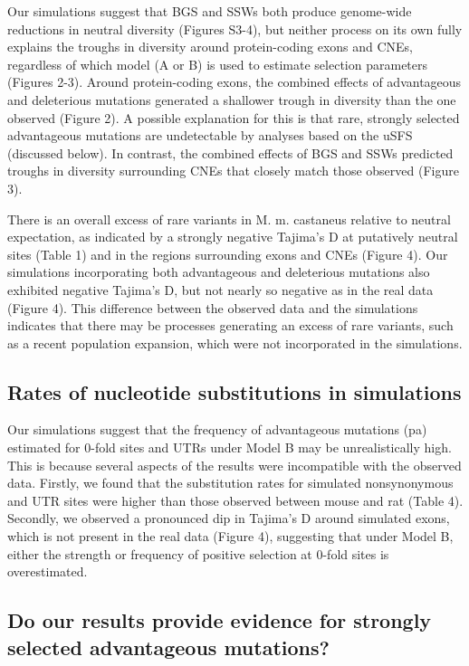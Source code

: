 Our simulations suggest that BGS and SSWs both produce genome-wide reductions in neutral diversity (Figures S3-4), but neither process on its own fully explains the troughs in diversity around protein-coding exons and CNEs, regardless of which model (A or B) is used to estimate selection parameters (Figures 2-3). Around protein-coding exons, the combined effects of advantageous and deleterious mutations generated a shallower trough in diversity than the one observed (Figure 2). A possible explanation for this is that rare, strongly selected advantageous mutations are undetectable by analyses based on the uSFS (discussed below). In contrast, the combined effects of BGS and SSWs predicted troughs in diversity surrounding CNEs that closely match those observed (Figure 3). 

There is an overall excess of rare variants in M. m. castaneus relative to neutral expectation, as indicated by a strongly negative Tajima’s D at putatively neutral sites (Table 1) and in the regions surrounding exons and CNEs (Figure 4). Our simulations incorporating both advantageous and deleterious mutations also exhibited negative Tajima’s D, but not nearly so negative as in the real data (Figure 4). This difference between the observed data and the simulations indicates that there may be processes generating an excess of rare variants, such as a recent population expansion, which were not incorporated in the simulations.

\subsection{Rates of nucleotide substitutions in simulations}

Our simulations suggest that the frequency of advantageous mutations (pa) estimated for 0-fold sites and UTRs under Model B may be unrealistically high. This is because several aspects of the results were incompatible with the observed data. Firstly, we found that the substitution rates for simulated nonsynonymous and UTR sites were higher than those observed between mouse and rat (Table 4). Secondly, we observed a pronounced dip in Tajima’s D around simulated exons, which is not present in the real data (Figure 4), suggesting that under Model B, either the strength or frequency of positive selection at 0-fold sites is overestimated. 

\subsection{Do our results provide evidence for strongly selected advantageous mutations?}

